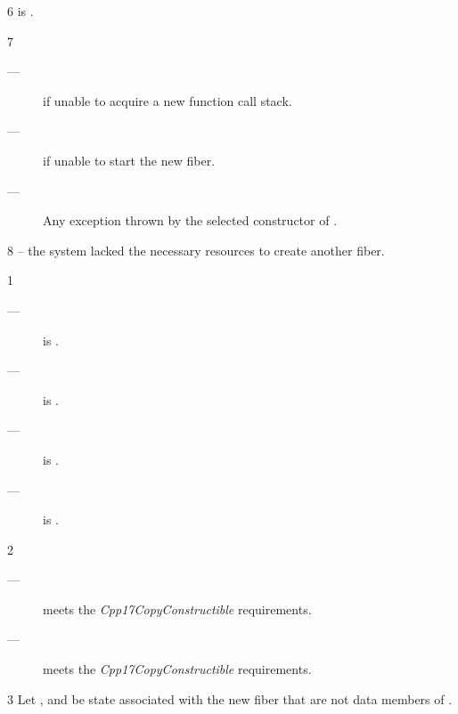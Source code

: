 6 \postcond
\emptyfn is \false.

7 \except
\begin{description}
    \item[---]  if unable to acquire a new function call stack.
    \item[---]  if unable to start the new fiber.
    \item[---] Any exception thrown by the selected constructor of .
\end{description}

8 \errors
{} -- the system lacked the necessary resources to create another fiber.


1 \mandates
\begin{description}
    \item[---]  is \true.
    \item[---]  is \true.
    \item[---]  is \true.
    \item[---]  is \true.
\end{description}

2 \precond
\begin{description}
    \item[---]  meets the \emph{Cpp17CopyConstructible} requirements.
    \item[---]  meets the \emph{Cpp17CopyConstructible} requirements.
\end{description}

3 Let , 
and  be state associated with the new fiber
that are not data members of \fiber. 

